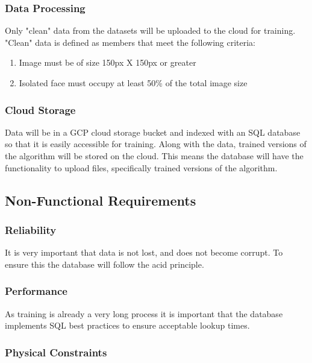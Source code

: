 \documentclass[12pt]{article}
\begin{document}
\subsubsection{Data Processing} \label{data processing}

Only "clean" data from the datasets will be uploaded to the cloud for training. "Clean" data
is defined as members that meet the following criteria:\\

\begin{enumerate}
    \item Image must be of size 150px X 150px or greater
    \item Isolated face must occupy at least 50\% of the total image size
\end{enumerate}

\subsubsection{Cloud Storage}

Data will be in a GCP cloud storage bucket and indexed with an SQL database so that
it is easily accessible for training. Along with the data, trained versions of the algorithm
will be stored on the cloud. This means the database will have the functionality to upload files,
specifically trained versions of the algorithm.

\subsection{Non-Functional Requirements}

\subsubsection {Reliability}

It is very important that data is not lost, and does not become corrupt. To ensure this the
database will follow the acid principle.

\subsubsection {Performance}

As training is already a very long process it is important that the database implements SQL best
practices to ensure acceptable lookup times.

\subsubsection {Physical Constraints}
\end{document}

